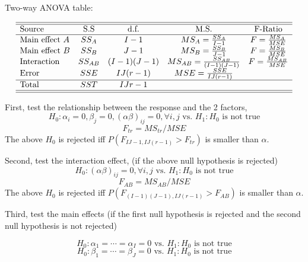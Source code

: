 \documentclass[11pt,a4paper]{article}
\begin{document}
Two-way ANOVA table: \par
\[
\begin{array}{lcccc}
    \hline\hline
    \text{Source} & \text{S.S} & \text{d.f.} & \text{M.S.} & \text{F-Ratio} \\
    \hline
    \text{Main effect } A & SS_A & I-1 & MS_A = \frac{SS_A}{I-1} & F = \frac{MS_A}{MSE} \\
    \text{Main effect } B & SS_B & J-1 & MS_B = \frac{SS_B}{J-1} & F = \frac{MS_B}{MSE} \\ 
    \text{Interaction} & SS_{AB} & (I-1)(J-1) & MS_{AB} = \frac{SS_{AB}}{(I-1)(J-1)} & F = \frac{MS_{AB}}{MSE} \\
    \text{Error} & SSE & IJ(r-1) & MSE = \frac{SSE}{IJ(r-1)} & \\
    \hline
    \text{Total} & SST & IJr - 1 & & \\
    \hline\hline
\end{array}
\]

First, test the relationship between the response and the 2 factors,
\[
H_0: \alpha_i = 0, \beta_j = 0, (\alpha \beta)_{ij} = 0, \forall i, j \text{ vs. } H_1: H_0 \text{ is not true}
\]
\[
F_{tr} = MS_{tr} / MSE
\]
The above $H_0$ is rejected iff $P(F_{IJ-1, IJ(r-1)} > F_{tr})$ is smaller than $\alpha$. \par

Second, test the interaction effect, (if the above null hypothesis is rejected)
\[
H_0: (\alpha \beta)_{ij} = 0, \forall i, j \text{ vs. } H_1: H_0 \text{ is not true}
\]
\[
F_{AB} = MS_{AB} / MSE
\]
The above $H_0$ is rejected iff $P(F_{(I-1)(J-1), IJ(r-1)} > F_{AB})$ is smaller than $\alpha$. \par

Third, test the main effects (if the first null hypothesis is rejected and the second null hypothesis is not rejected) \par
\[
H_0: \alpha_1 = \cdots = \alpha_I = 0 \text{ vs. } H_1: H_0 \text{ is not true}
\]
\[
H_0: \beta_1 = \cdots = \beta_J = 0 \text{ vs. } H_1: H_0 \text{ is not true}
\]

\end{document}
